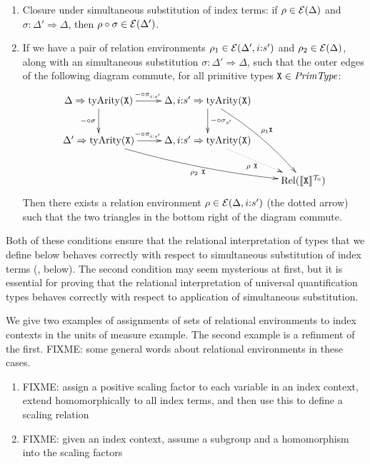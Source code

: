 \begin{enumerate}
\item Closure under simultaneous substitution of index terms: if $\rho
  \in \mathcal{E}(\Delta)$ and $\sigma : \Delta' \Rightarrow \Delta$,
  then $\rho \circ \sigma \in \mathcal{E}(\Delta')$.
\item If we have a pair of relation environments $\rho_1 \in
  \mathcal{E}(\Delta', i\mathord:s')$ and $\rho_2 \in
  \mathcal{E}(\Delta)$, along with an simultaneous substitution $\sigma
  : \Delta' \Rightarrow \Delta$, such that the outer edges of the
  following diagram commute, for all primitive types $\texttt{X} \in
  \mathit{PrimType}$:
  \begin{displaymath}
    \xymatrix{
      {\Delta \Rightarrow \primTyArity(\tyPrimNm{X})} \ar[r]^(.45){- \circ \pi_{i\mathord:s'}} \ar[d]_{- \circ \sigma}
      &
      {\Delta,i\mathord:s' \Rightarrow \primTyArity(\tyPrimNm{X})} \ar[d]^{- \circ \sigma_{s'}} \ar@/^/[rdd]^{\rho_1 \tyPrimNm{X}}
      \\
      {\Delta' \Rightarrow \primTyArity(\tyPrimNm{X})} \ar[r]^(.45){- \circ \pi_{i\mathord:s'}} \ar@/_/[rrd]_{\rho_2\ \tyPrimNm{X}}
      &
      {\Delta,i\mathord:s' \Rightarrow \primTyArity(\tyPrimNm{X})} \ar@{.>}[dr]_{\rho\ \tyPrimNm{X}}
      \\
      &
      &
      {\Rel(\tyPrimSem{\tyPrimNm{X}})}
    }
  \end{displaymath}
  Then there exists a relation environment $\rho \in
  \mathcal{E}(\Delta,i\mathord:s')$ (the dotted arrow) such that the
  two triangles in the bottom right of the diagram commute.
\end{enumerate}

Both of these conditions ensure that the relational interpretation of
types that we define below behaves correctly with respect to
simultaneous substitution of index terms
(, below). The second condition may
seem mysterious at first, but it is essential for proving that the
relational interpretation of universal quantification types behaves
correctly with respect to application of simultaneous substitution.

\begin{example}
  We give two examples of assignments of sets of relational
  environments to index contexts in the units of measure example. The
  second example is a refinment of the first. FIXME: some general
  words about relational environments in these cases.
  \begin{enumerate}
  \item FIXME: assign a positive scaling factor to each variable in an
    index context, extend homomorphically to all index terms, and then
    use this to define a scaling relation
  \item FIXME: given an index context, assume a subgroup and a
    homomorphism into the scaling factors
  \end{enumerate}
\end{example}

